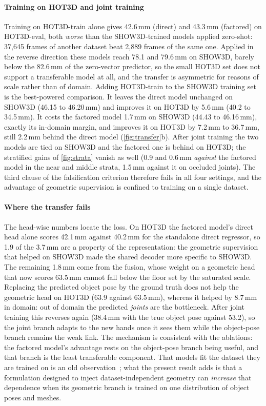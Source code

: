 \paragraph{Training on HOT3D and joint training}
Training on HOT3D-train alone gives 42.6\,mm (direct) and 43.3\,mm (factored) on HOT3D-eval, both \emph{worse} than the SHOW3D-trained models applied zero-shot: 37,645 frames of another dataset beat 2,889 frames of the same one. Applied in the reverse direction these models reach 78.1 and 79.6\,mm on SHOW3D, barely below the 82.6\,mm of the zero-vector predictor, so the small HOT3D set does not support a transferable model at all, and the transfer is asymmetric for reasons of scale rather than of domain. Adding HOT3D-train to the SHOW3D training set is the best-powered comparison. It leaves the direct model unchanged on SHOW3D (46.15 to 46.20\,mm) and improves it on HOT3D by 5.6\,mm (40.2 to 34.5\,mm). It costs the factored model 1.7\,mm on SHOW3D (44.43 to 46.16\,mm), exactly its in-domain margin, and improves it on HOT3D by 7.2\,mm to 36.7\,mm, still 2.2\,mm behind the direct model (\cref{fig:transfer}b). After joint training the two models are tied on SHOW3D and the factored one is behind on HOT3D; the stratified gains of \cref{fig:strata} vanish as well (0.9 and 0.6\,mm \emph{against} the factored model in the near and middle strata, 1.5\,mm against it on occluded joints). The third clause of the falsification criterion therefore fails in all four settings, and the advantage of geometric supervision is confined to training on a single dataset.

\paragraph{Where the transfer fails}
The head-wise numbers locate the loss. On HOT3D the factored model's direct head alone scores 42.1\,mm against 40.2\,mm for the standalone direct regressor, so 1.9 of the 3.7\,mm are a property of the representation: the geometric supervision that helped on SHOW3D made the shared decoder more specific to SHOW3D. The remaining 1.8\,mm come from the fusion, whose weight on a geometric head that now scores 63.5\,mm cannot fall below the floor set by the saturated scale. Replacing the predicted object pose by the ground truth does not help the geometric head on HOT3D (63.9 against 63.5\,mm), whereas it helped by 8.7\,mm in domain: out of domain the predicted \emph{joints} are the bottleneck. After joint training this reverses again (38.4\,mm with the true object pose against 53.2), so the joint branch adapts to the new hands once it sees them while the object-pose branch remains the weak link. The mechanism is consistent with the ablations: the factored model's advantage rests on the object-pose branch being useful, and that branch is the least transferable component. That models fit the dataset they are trained on is an old observation~\cite{torralba2011unbiased}; what the present result adds is that a formulation designed to inject dataset-independent geometry can \emph{increase} that dependence when its geometric branch is trained on one distribution of object poses and meshes.

